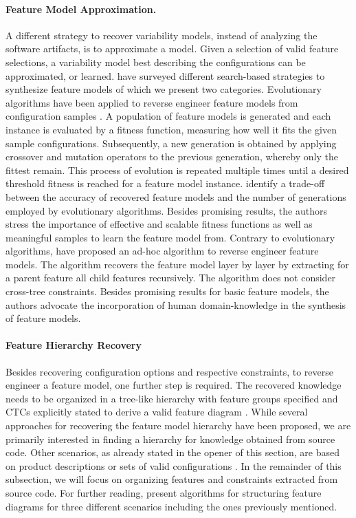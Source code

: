 \paragraph{Feature Model Approximation.}
A different strategy to recover variability models, instead of analyzing the
software artifacts, is to approximate a model. Given a selection of valid
feature selections, a variability model best describing the configurations can
be approximated, or learned. \cite{lopez-herrejon_assessment_2015} have surveyed
different search-based strategies to synthesize feature models of which we
present two categories. Evolutionary algorithms have been applied to reverse
engineer feature models from configuration samples
\citep{lopez-herrejon_reverse_2012,linsbauer_feature_2014}. A population of
feature models is generated and each instance is evaluated by a fitness function, measuring how well it fits the given sample configurations. Subsequently, a new generation is obtained by applying
crossover and mutation operators to the previous generation, whereby only the
fittest remain. This process of evolution is repeated multiple times until a
desired threshold fitness is reached for a feature model instance.
\cite{lopez-herrejon_reverse_2012} identify a trade-off between the accuracy of
recovered feature models and the number of generations employed by evolutionary
algorithms. Besides promising results, the authors stress the importance of
effective and scalable fitness functions as well as meaningful samples to learn
the feature model from.
Contrary to evolutionary algorithms,
\cite{haslinger_reverse_2011,haslinger_extracting_2013} have proposed an ad-hoc
algorithm to reverse engineer feature models. The algorithm recovers
the feature model layer by layer by  extracting for a parent feature all child
features recursively. The algorithm does not consider cross-tree constraints.
Besides promising results for basic feature models, the authors advocate the
incorporation of human domain-knowledge in the synthesis of feature models.
 
\paragraph{Feature Hierarchy Recovery} \label{sec:feature_hierarchy}
Besides recovering configuration options and respective constraints, to reverse
engineer a feature model, one further step is required. The recovered knowledge
needs to be organized in a tree-like hierarchy with feature groups specified and
CTCs explicitly stated to derive a valid feature diagram 
\citep{kang_feature-oriented_1990}.
While several approaches for recovering the feature model hierarchy have been
proposed, we are primarily interested in finding a hierarchy for knowledge
obtained from source code. Other scenarios, as already stated in the opener of
this section, are based on product descriptions or sets of valid configurations
\citep{aleti_software_2013,bakar_feature_2015}. In the remainder of this
subsection, we will focus on organizing features and constraints extracted from
source code. For further reading, \cite{andersen_efficient_2012} present algorithms for structuring feature diagrams for three different scenarios including the ones previously mentioned.

